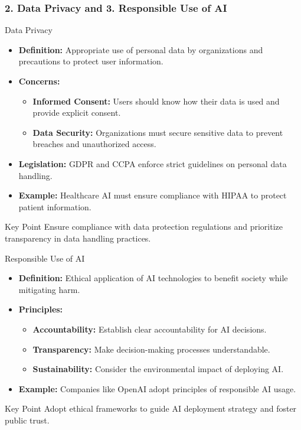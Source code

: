 \documentclass[aspectratio=169]{beamer}
\begin{document}
\begin{frame}[fragile]
    \frametitle{2. Data Privacy and 3. Responsible Use of AI}
    \begin{block}{Data Privacy}
        \begin{itemize}
            \item \textbf{Definition:} Appropriate use of personal data by organizations and precautions to protect user information.
            \item \textbf{Concerns:}
            \begin{itemize}
                \item \textbf{Informed Consent:} Users should know how their data is used and provide explicit consent.
                \item \textbf{Data Security:} Organizations must secure sensitive data to prevent breaches and unauthorized access.
            \end{itemize}
            \item \textbf{Legislation:} GDPR and CCPA enforce strict guidelines on personal data handling.
            \item \textbf{Example:} Healthcare AI must ensure compliance with HIPAA to protect patient information.
        \end{itemize}
        \begin{block}{Key Point}
            Ensure compliance with data protection regulations and prioritize transparency in data handling practices.
        \end{block}
    \end{block}

    \begin{block}{Responsible Use of AI}
        \begin{itemize}
            \item \textbf{Definition:} Ethical application of AI technologies to benefit society while mitigating harm.
            \item \textbf{Principles:}
            \begin{itemize}
                \item \textbf{Accountability:} Establish clear accountability for AI decisions.
                \item \textbf{Transparency:} Make decision-making processes understandable.
                \item \textbf{Sustainability:} Consider the environmental impact of deploying AI.
            \end{itemize}
            \item \textbf{Example:} Companies like OpenAI adopt principles of responsible AI usage.
        \end{itemize}
        \begin{block}{Key Point}
            Adopt ethical frameworks to guide AI deployment strategy and foster public trust.
        \end{block}
    \end{block}
\end{frame}
\end{document}
